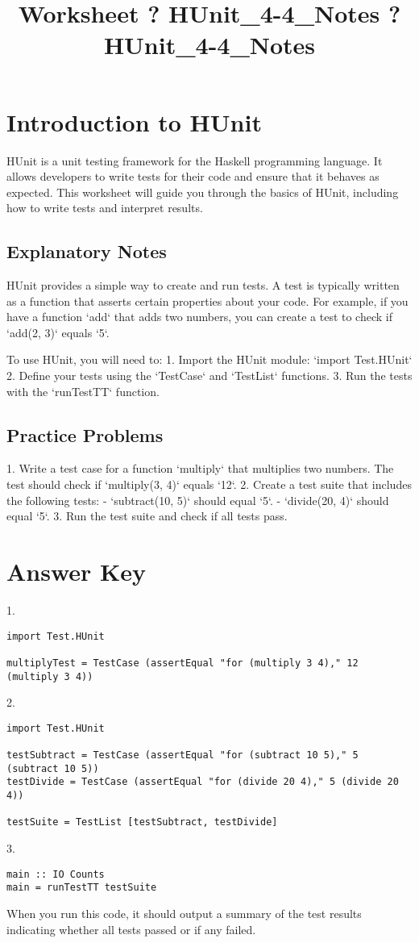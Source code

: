 \documentclass{article}
\title{Worksheet ? HUnit\_4-4\_Notes ? HUnit\_4-4\_Notes}
\author{}
\date{}
\begin{document}
\maketitle

\section*{Introduction to HUnit}
HUnit is a unit testing framework for the Haskell programming language. It allows developers to write tests for their code and ensure that it behaves as expected. This worksheet will guide you through the basics of HUnit, including how to write tests and interpret results.

\subsection*{Explanatory Notes}
HUnit provides a simple way to create and run tests. A test is typically written as a function that asserts certain properties about your code. For example, if you have a function `add` that adds two numbers, you can create a test to check if `add(2, 3)` equals `5`. 

To use HUnit, you will need to:
1. Import the HUnit module: `import Test.HUnit`
2. Define your tests using the `TestCase` and `TestList` functions.
3. Run the tests with the `runTestTT` function.

\subsection*{Practice Problems}
1. Write a test case for a function `multiply` that multiplies two numbers. The test should check if `multiply(3, 4)` equals `12`.
2. Create a test suite that includes the following tests:
   - `subtract(10, 5)` should equal `5`.
   - `divide(20, 4)` should equal `5`.
3. Run the test suite and check if all tests pass.

\section*{Answer Key}
1. 
\begin{verbatim}
import Test.HUnit

multiplyTest = TestCase (assertEqual "for (multiply 3 4)," 12 (multiply 3 4))
\end{verbatim}

2. 
\begin{verbatim}
import Test.HUnit

testSubtract = TestCase (assertEqual "for (subtract 10 5)," 5 (subtract 10 5))
testDivide = TestCase (assertEqual "for (divide 20 4)," 5 (divide 20 4))

testSuite = TestList [testSubtract, testDivide]
\end{verbatim}

3. 
\begin{verbatim}
main :: IO Counts
main = runTestTT testSuite
\end{verbatim}
When you run this code, it should output a summary of the test results indicating whether all tests passed or if any failed.
\end{document}
